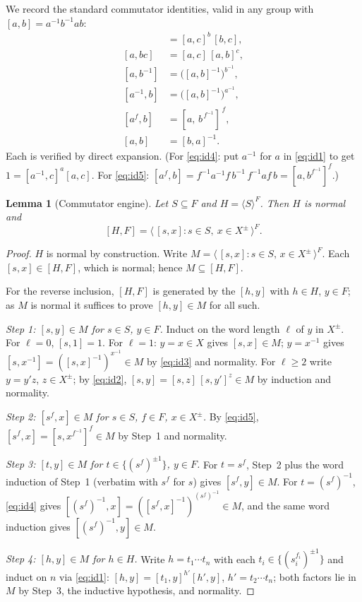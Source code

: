\documentclass{amsart}
\newtheorem{lemma}{Lemma}
\theoremstyle{definition}
\theoremstyle{remark}
\begin{document}
We record the standard commutator identities, valid in any group with
$[a,b]=a^{-1}b^{-1}ab$:
\begin{align}
[ab,c]&=[a,c]^{b}\,[b,c], \label{eq:id1}\\
[a,bc]&=[a,c]\,[a,b]^{c}, \label{eq:id2}\\
[a,b^{-1}]&=\big([a,b]^{-1}\big)^{b^{-1}}, \label{eq:id3}\\
[a^{-1},b]&=\big([a,b]^{-1}\big)^{a^{-1}}, \label{eq:id4}\\
[a^{f},b]&=[a,\,b^{\,f^{-1}}]^{\,f}, \label{eq:id5}\\
[a,b]&=[b,a]^{-1}. \label{eq:id6}
\end{align}
Each is verified by direct expansion. (For \eqref{eq:id4}: put $a^{-1}$ for $a$ in
\eqref{eq:id1} to get $1=[a^{-1},c]^{a}[a,c]$. For \eqref{eq:id5}:
$[a^f,b]=f^{-1}a^{-1}f\,b^{-1}\,f^{-1}af\,b=[a,b^{f^{-1}}]^{f}$.)

\begin{lemma}[Commutator engine]\label{lem:engine}
Let $S\subseteq F$ and $H=\langle S\rangle^{F}$. Then $H$ is normal and
\begin{equation}\label{eq:engine}
[H,F]=\big\langle\,[s,x] : s\in S,\ x\in X^{\pm}\,\big\rangle^{F}.
\end{equation}
\end{lemma}
\begin{proof}
$H$ is normal by construction. Write
$M=\langle\,[s,x]:s\in S,\,x\in X^{\pm}\,\rangle^{F}$. Each $[s,x]\in[H,F]$, which is
normal; hence $M\subseteq[H,F]$.

For the reverse inclusion, $[H,F]$ is generated by the $[h,y]$ with $h\in H$,
$y\in F$; as $M$ is normal it suffices to prove $[h,y]\in M$ for all such.

\emph{Step 1: $[s,y]\in M$ for $s\in S$, $y\in F$.} Induct on the word length
$\ell$ of $y$ in $X^{\pm}$. For $\ell=0$, $[s,1]=1$. For $\ell=1$: $y=x\in X$ gives
$[s,x]\in M$; $y=x^{-1}$ gives $[s,x^{-1}]=([s,x]^{-1})^{x^{-1}}\in M$ by
\eqref{eq:id3} and normality. For $\ell\ge2$ write $y=y'z$, $z\in X^{\pm}$; by
\eqref{eq:id2}, $[s,y]=[s,z]\,[s,y']^{z}\in M$ by induction and normality.

\emph{Step 2: $[s^{f},x]\in M$ for $s\in S$, $f\in F$, $x\in X^{\pm}$.} By
\eqref{eq:id5}, $[s^{f},x]=[s,x^{f^{-1}}]^{f}\in M$ by Step~1 and normality.

\emph{Step 3: $[t,y]\in M$ for $t\in\{(s^{f})^{\pm1}\}$, $y\in F$.} For $t=s^f$,
Step~2 plus the word induction of Step~1 (verbatim with $s^f$ for $s$) gives
$[s^f,y]\in M$. For $t=(s^f)^{-1}$, \eqref{eq:id4} gives
$[(s^f)^{-1},x]=([s^f,x]^{-1})^{(s^f)^{-1}}\in M$, and the same word induction gives
$[(s^f)^{-1},y]\in M$.

\emph{Step 4: $[h,y]\in M$ for $h\in H$.} Write $h=t_1\cdots t_n$ with each
$t_i\in\{(s_i^{f_i})^{\pm1}\}$ and induct on $n$ via \eqref{eq:id1}:
$[h,y]=[t_1,y]^{h'}[h',y]$, $h'=t_2\cdots t_n$; both factors lie in $M$ by Step~3,
the inductive hypothesis, and normality.
\end{proof}
\end{document}
